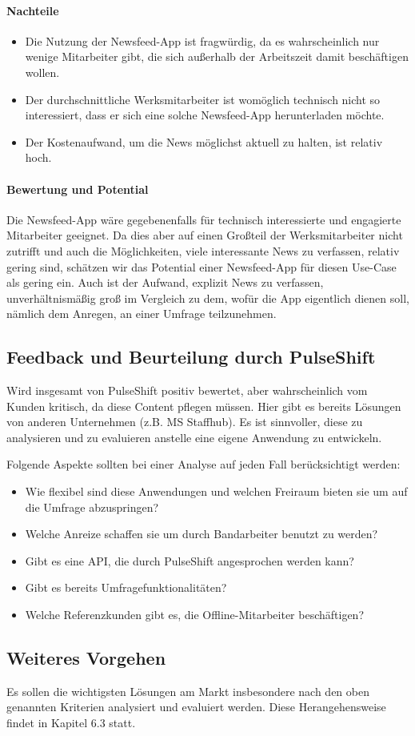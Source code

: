 \paragraph{Nachteile}

\begin{itemize}
\item Die Nutzung der Newsfeed-App ist fragwürdig, da es wahrscheinlich nur wenige Mitarbeiter gibt, die sich außerhalb der Arbeitszeit damit beschäftigen wollen.
\item Der durchschnittliche Werksmitarbeiter ist womöglich technisch nicht so interessiert, dass er sich eine solche Newsfeed-App herunterladen möchte.
\item Der Kostenaufwand, um die News möglichst aktuell zu halten, ist relativ hoch.
\end{itemize}

\paragraph{Bewertung und Potential}

Die Newsfeed-App wäre gegebenenfalls für technisch interessierte und engagierte Mitarbeiter geeignet. Da dies aber auf einen Großteil der Werksmitarbeiter nicht zutrifft und auch die Möglichkeiten, viele interessante News zu verfassen, relativ gering sind, schätzen wir das Potential einer Newsfeed-App für diesen Use-Case als gering ein. Auch ist der Aufwand, explizit News zu verfassen, unverhältnismäßig groß im Vergleich zu dem, wofür die App eigentlich dienen soll, nämlich dem Anregen, an einer Umfrage teilzunehmen.

\subsection{Feedback und Beurteilung durch PulseShift}

Wird insgesamt von PulseShift positiv bewertet, aber wahrscheinlich vom Kunden kritisch, da diese Content pflegen müssen. Hier gibt es bereits Lösungen von anderen Unternehmen (z.B. MS Staffhub). Es ist sinnvoller, diese zu analysieren und zu evaluieren anstelle eine eigene Anwendung zu entwickeln. 

Folgende Aspekte sollten bei einer Analyse auf jeden Fall berücksichtigt werden: 

\begin{itemize}
\item Wie flexibel sind diese Anwendungen und welchen Freiraum bieten sie um auf die Umfrage abzuspringen? 
\item Welche Anreize schaffen sie um durch Bandarbeiter benutzt zu werden? 
\item Gibt es eine API, die durch PulseShift angesprochen werden kann? 
\item Gibt es bereits Umfragefunktionalitäten? 
\item Welche Referenzkunden gibt es, die Offline-Mitarbeiter beschäftigen? 
\end{itemize}

\subsection{Weiteres Vorgehen}

Es sollen die wichtigsten Lösungen am Markt insbesondere nach den oben genannten Kriterien analysiert und evaluiert werden. Diese Herangehensweise findet in Kapitel 6.3 statt.
